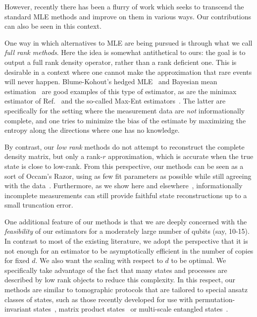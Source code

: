 However, recently there has been a flurry of work which seeks to transcend the standard MLE methods and improve on them in various ways. Our contributions can also be seen in this context. 

One way in which alternatives to MLE are being pursued is through what we call \emph{full rank methods}. Here the idea is somewhat antithetical to ours: the goal is to output a full rank density operator, rather than a rank deficient one. This is desirable in a context where one cannot make the approximation that rare events will never happen. Blume-Kohout's hedged MLE~\cite{Blume-Kohout2010} and Bayesian mean estimation~\cite{Blume-Kohout2010a} are good examples of this type of estimator, as are the minimax estimator of Ref.~\cite{Khoon-Ng2012} and the so-called Max-Ent estimators~\cite{Buzek2004, Teo2011, Teo2011a, Teo2012}. The latter are specifically for the setting where the measurement data are \emph{not} informationally complete, and one tries to minimize the bias of the estimate by maximizing the entropy along the directions where one has no knowledge. 

By contrast, our \emph{low rank} methods do not attempt to reconstruct the complete density matrix, but only a rank-$r$ approximation, which is accurate when the true state is close to low-rank. From this perspective, our methods can be seen as a sort of Occam's Razor, using as few fit parameters as possible while still agreeing with the data~\cite{Yin2011}. Furthermore, as we show here and elsewhere~\cite{Gross2010}, informationally incomplete measurements can still provide faithful state reconstructions up to a small truncation error.

One additional feature of our methods is that we are deeply concerned with the \emph{feasibility} of our estimators for a moderately large number of qubits (say, 10-15). In contrast to most of the existing literature, we adopt the perspective that it is not enough for an estimator to be asymptotically efficient in the number of copies for fixed $d$. We also want the scaling with respect to $d$ to be optimal. We specifically take advantage of the fact that many states and processes are described by low rank objects to reduce this complexity. In this respect, our methods are similar to tomographic protocols that are tailored to special ansatz classes of states, such as those recently developed for use with permutation-invariant states~\cite{Toth2010}, matrix product states~\cite{Cramer2010a} or multi-scale entangled states~\cite{Landon-Cardinal2012}.

